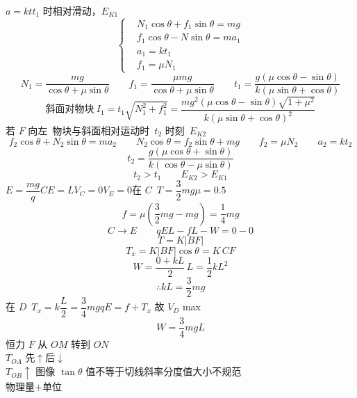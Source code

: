 $a=kt$\quad $t_1$ 时相对滑动，$E_{K1}$
\[
\left\{\begin{aligned}
&N_1\cos\theta+f_1\sin\theta=mg\\
&f_1\cos\theta-N\sin\theta=ma_1 %
\\
&a_1=kt_1\\
&f_1=\mu N_1
\end{aligned}\right.
\]
\[
N_1=\frac{mg}{\cos\theta+\mu\sin\theta}\qquad f_1=\frac{\mu mg}{\cos\theta+\mu\sin\theta}\qquad t_1=\frac{g(\mu\cos\theta-\sin\theta)}{k(\mu\sin\theta+\cos\theta)}
\]
\[
\text{斜面对物块}\ I_1=t_1\sqrt{N_1^2+f_1^2}=\frac{mg^2(\mu\cos\theta-\sin\theta)\sqrt{1+\mu^2}}{k(\mu\sin\theta+\cos\theta)^2}
\]
若 $F$ 向左\ 物块与斜面相对运动时\ $t_2$ 时刻\ $E_{K2}$
\[
f_2\cos\theta+N_2\sin\theta=ma_2\qquad N_2\cos\theta=f_2\sin\theta+mg\qquad f_2=\mu N_2\qquad a_2=kt_2
\]
\[
t_2=\frac{g(\mu\cos\theta+\sin\theta)}{k(\cos\theta-\mu\sin\theta)}
\]
\[
t_2>t_1\qquad E_{K2}>E_{K1}
\]
$E=\dfrac{mg}{q}$\qquad $CE=L$\qquad $V_C=0$\quad $V_E=0$\qquad 在 $C$\ $T=\dfrac32mg$\quad $\mu=0.5$
\[
f=\mu\left(\frac32mg-mg\right)=\frac14mg
\]
\[
C\to E\qquad qEL-fL-W=0-0
\]
\[
T=K|BF| %
\]
\[
T_x=K|BF|\cos\theta=K\,CF
\]
\[
W=\frac{0+kL}{2}\,L=\frac12kL^2
\]
\[
\therefore kL=\frac32mg
\]
在 $D$\ $T_x=k\dfrac{L}{2}=\dfrac34mg$\qquad $qE=f+T_x$ 故 $V_D$ max
\[
W=\frac34mgL
\]
恒力 $F$ 从 $OM$ 转到 $ON$ \\
$T_{OA}$ 先$\uparrow$后$\downarrow$ \\
$T_{OB}\uparrow$
图像 $\tan\theta$ 值不等于切线斜率\quad 分度值大小不规范 \\
物理量$+$单位
